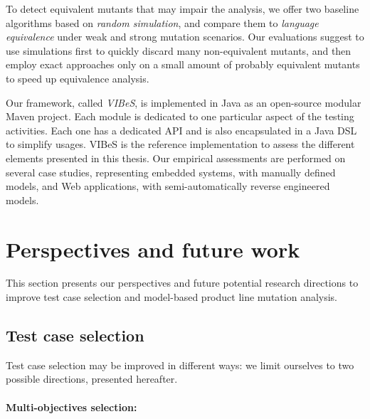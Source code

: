 To detect equivalent mutants that may impair the analysis, we offer two baseline algorithms based on \emph{random simulation}, and compare them to \emph{language equivalence} under weak and strong mutation scenarios. Our evaluations suggest to use simulations first to quickly discard many non-equivalent mutants, and then employ exact approaches only on a small amount of probably equivalent mutants to speed up equivalence analysis.

Our framework, called \emph{\gls{VIBeS}}, is implemented in Java as an open-source modular Maven project. Each module is dedicated to one particular aspect of the testing activities. Each one has a dedicated API and is also encapsulated in a Java DSL to simplify usages.
VIBeS is the reference implementation to assess the different elements presented in this thesis. Our empirical assessments are performed on several case studies, representing embedded systems, with manually defined models, and Web applications, with semi-automatically reverse engineered models. 


\section{Perspectives and future work}

This section presents our perspectives and future potential research directions to improve test case selection and model-based product line mutation analysis. 


\subsection{Test case selection}

Test case selection may be improved in different ways: we limit ourselves to two possible directions, presented hereafter.

\paragraph{Multi-objectives selection:}

